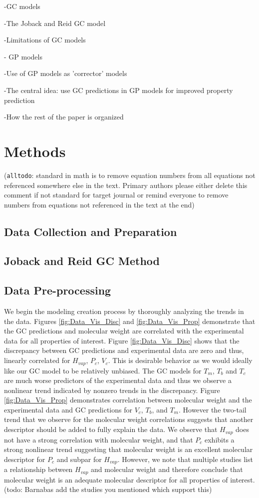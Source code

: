 \documentclass[journal=jacsat,manuscript=article]{achemso}
\newcommand{\alltodo}[1]{{\color{Cyan} (\texttt{alltodo}: #1)}}
\begin{document}
-GC models

-The Joback and Reid GC model

-Limitations of GC models

- GP models

-Use of GP models as 'corrector' models

-The central idea: use GC predictions in GP models for improved property prediction

-How the rest of the paper is organized


\section{Methods}
\alltodo{standard in math is to remove equation numbers from all equations not referenced somewhere else in the text. Primary authors please either delete this comment if not standard for target journal or remind everyone to remove numbers from equations not referenced in the text at the end}
\subsection{Data Collection and Preparation}
\subsection{Joback and Reid GC Method}
\subsection{Data Pre-processing} \label{sec:preprocess}
We begin the modeling creation process by thoroughly analyzing the trends in the data. Figures \ref{fig:Data_Vis_Disc} and \ref{fig:Data_Vis_Prop} demonstrate that the GC predictions and molecular weight are correlated with the experimental data for all properties of interest. Figure \ref{fig:Data_Vis_Disc} shows that the discrepancy between GC predictions and experimental data are zero and thus, linearly correlated for $H_{vap}$, $P_c$, $V_c$. This is desirable behavior as we would ideally like our GC model to be relatively unbiased. The GC models for $T_m$, $T_b$ and $T_c$ are much worse predictors of the experimental data and thus we observe a nonlinear trend indicated by nonzero trends in the discrepancy. Figure \ref{fig:Data_Vis_Prop} demonstrates correlation between molecular weight and the experimental data and GC predictions for $V_c$, $T_b$, and $T_m$. However the two-tail trend that we observe for the molecular weight correlations suggests that another descriptor should be added to fully explain the data. We observe that $H_{vap}$ does not have a strong correlation with molecular weight, and that $P_c$ exhibits a strong nonlinear trend suggesting that molecular weight is an excellent molecular descriptor for $P_c$ and subpar for $H_{vap}$. However, we note that multiple studies list a relationship between $H_{vap}$ and molecular weight and therefore conclude that molecular weight is an adequate molecular descriptor for all properties of interest. (todo: Barnabas add the studies you mentioned which support this)
\end{document}
